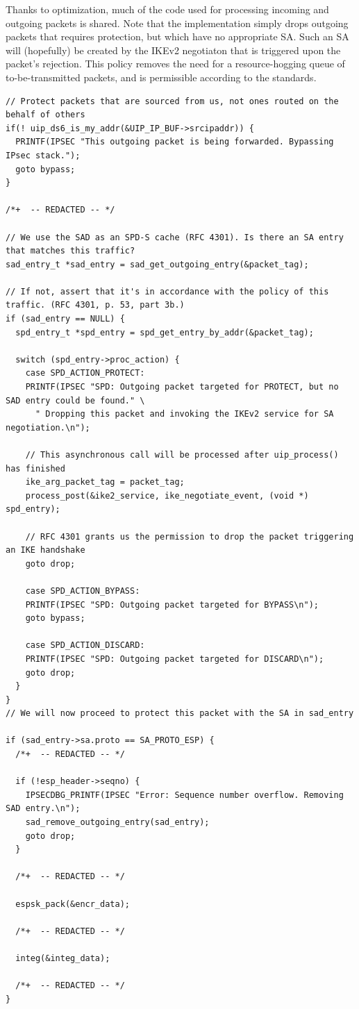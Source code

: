 \documentclass[final,a4paper,twoside,11pt,onecolumn]{report}
\begin{document}
Thanks to optimization, much of the code used for processing incoming and outgoing packets is shared. Note that the implementation simply drops outgoing packets that requires protection, but which have no appropriate SA. Such an SA will (hopefully) be created by the IKEv2 negotiaton that is triggered upon the packet's rejection. This policy removes the need for a resource-hogging queue of to-be-transmitted packets, and is permissible according to the standards\citep[p.53]{rfc4301}.

\begin{lstlisting}
// Protect packets that are sourced from us, not ones routed on the behalf of others
if(! uip_ds6_is_my_addr(&UIP_IP_BUF->srcipaddr)) {
  PRINTF(IPSEC "This outgoing packet is being forwarded. Bypassing IPsec stack.");
  goto bypass;
}

/*+  -- REDACTED -- */

// We use the SAD as an SPD-S cache (RFC 4301). Is there an SA entry that matches this traffic?
sad_entry_t *sad_entry = sad_get_outgoing_entry(&packet_tag);

// If not, assert that it's in accordance with the policy of this traffic. (RFC 4301, p. 53, part 3b.)
if (sad_entry == NULL) {
  spd_entry_t *spd_entry = spd_get_entry_by_addr(&packet_tag);

  switch (spd_entry->proc_action) {
    case SPD_ACTION_PROTECT:
    PRINTF(IPSEC "SPD: Outgoing packet targeted for PROTECT, but no SAD entry could be found." \
      " Dropping this packet and invoking the IKEv2 service for SA negotiation.\n");

    // This asynchronous call will be processed after uip_process() has finished
    ike_arg_packet_tag = packet_tag;
    process_post(&ike2_service, ike_negotiate_event, (void *) spd_entry);
        
    // RFC 4301 grants us the permission to drop the packet triggering an IKE handshake
    goto drop;
    
    case SPD_ACTION_BYPASS:
    PRINTF(IPSEC "SPD: Outgoing packet targeted for BYPASS\n");
    goto bypass;

    case SPD_ACTION_DISCARD:
    PRINTF(IPSEC "SPD: Outgoing packet targeted for DISCARD\n");
    goto drop;
  }
}
// We will now proceed to protect this packet with the SA in sad_entry

if (sad_entry->sa.proto == SA_PROTO_ESP) {
  /*+  -- REDACTED -- */

  if (!esp_header->seqno) {
    IPSECDBG_PRINTF(IPSEC "Error: Sequence number overflow. Removing SAD entry.\n");
    sad_remove_outgoing_entry(sad_entry);
    goto drop;
  }

  /*+  -- REDACTED -- */
  
  espsk_pack(&encr_data);
  
  /*+  -- REDACTED -- */
  
  integ(&integ_data);

  /*+  -- REDACTED -- */
}
\end{lstlisting}
\end{document}
